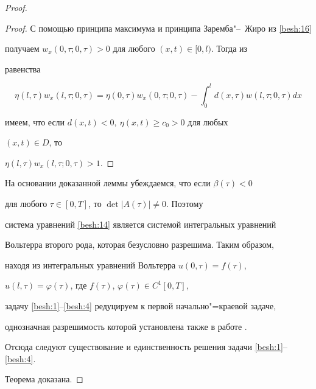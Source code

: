 \begin{proof}
\begin{proof}
С помощью принципа максимума и принципа Заремба"--~Жиро из \eqref{besh:16}

получаем $w_{x}(0,\tau;0,\tau)>0$ для любого $(x,t) \in [0,l)$. Тогда из

равенства

$$

\eta(l,\tau)w_{x}(l,\tau;0,\tau) =\eta(0,\tau)w_{x}(0,\tau;0,\tau)-

\int^{l}_{0}d(x,\tau) w(l,\tau;0,\tau)dx

$$

имеем, что если $d(x,t)<0, \ \eta(x,t)\geq c_{0} >0$ для любых

$(x,t) \in D$, то



\bigskip

\hspace{4cm}

$

\eta(l,\tau)w_{x}(l,\tau;0,\tau)>1.

$

\end{proof}



\bigskip



На основании доказанной леммы убеждаемся, что если $\beta(\tau)<0$

для любого $\tau \in [0,T]$, то $\det |A(\tau)|\neq 0$. Поэтому

система уравнений \eqref{besh:14} является системой интегральных уравнений

Вольтерра второго рода, которая безусловно разрешима. Таким образом,

находя из интегральных уравнений Вольтерра $u(0,\tau)=f(\tau)$,

$u(l,\tau)=\varphi(\tau)$, где $f(\tau)$, $\varphi(\tau) \in C^1[0,T]$,

задачу \eqref{besh:1}--\eqref{besh:4} редуцируем к первой начально"=краевой задаче,

однозначная разрешимость которой установлена также в работе \cite{besh:bib:Shhanukov}.

Отсюда следуют существование и единственность решения задачи \eqref{besh:1}--\eqref{besh:4}.

Теорема доказана.

\end{proof}



\smallskip



